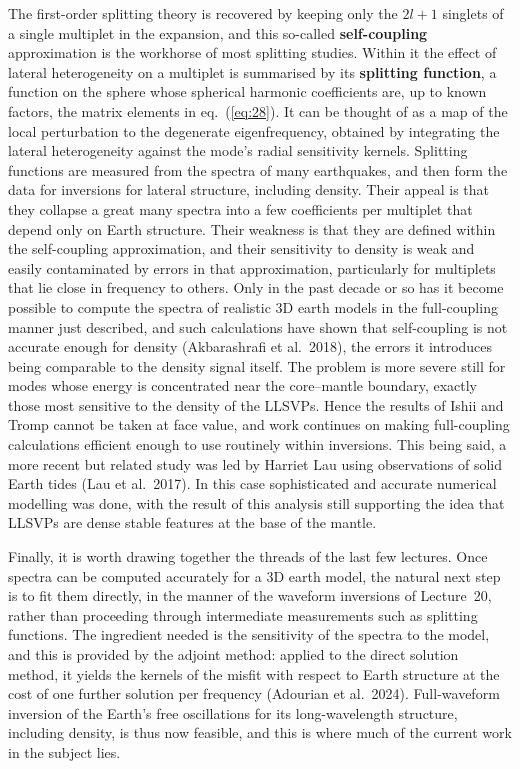 The first-order splitting theory is recovered by keeping only the $2l+1$ singlets of a single multiplet in the expansion, 
and this so-called \textbf{self-coupling} approximation is the workhorse of most splitting studies. Within it the effect of lateral heterogeneity 
on a multiplet is summarised by its \textbf{splitting function}, a function on the sphere whose spherical harmonic coefficients 
are, up to known factors, the matrix elements in eq.~(\ref{eq:28}). It can be thought of as a map of the 
local perturbation to the degenerate eigenfrequency, obtained by integrating the lateral heterogeneity against the mode's 
radial sensitivity kernels. Splitting functions are measured from the spectra of many earthquakes, and then form the data 
for inversions for lateral structure, including density. Their appeal is that they collapse a great many spectra into a few 
coefficients per multiplet that depend only on Earth structure. Their weakness is that they are defined 
within the self-coupling approximation, and their sensitivity to density is weak and easily contaminated by errors in that 
approximation, particularly for multiplets that lie close in frequency to others. Only in the past decade or so has it 
become possible to compute the spectra of realistic 3D earth models in the full-coupling manner just described, 
and such calculations have shown that self-coupling is not accurate enough for density (Akbarashrafi et al.\ 2018), the 
errors it introduces being comparable to the density signal itself. The problem is more severe still for modes 
whose energy is concentrated near the core--mantle boundary, exactly those most sensitive to the density of the LLSVPs. 
Hence the results of Ishii and Tromp cannot be taken at face value, and work continues on making full-coupling calculations 
efficient enough to use routinely within inversions. This being said, a more recent but related study was
led by Harriet Lau using observations of solid Earth tides (Lau et al.\ 2017). In this case sophisticated and accurate numerical modelling 
was done, with the result of this analysis still supporting the idea that LLSVPs are dense stable features 
at the base of the mantle. 

Finally, it is worth drawing together the threads of the last few lectures. Once spectra can be computed accurately for a 3D earth 
model, the natural next step is to fit them directly, in the manner of the waveform inversions of Lecture~20, rather than 
proceeding through intermediate measurements such as splitting functions. The ingredient needed is the sensitivity of the 
spectra to the model, and this is provided by the adjoint method: applied to the direct solution method, 
it yields the kernels of the misfit with respect to Earth structure at the cost of one further solution per frequency 
(Adourian et al.\ 2024). Full-waveform inversion of the Earth's free oscillations for its long-wavelength 
structure, including density, is thus now feasible, and this is where much of the current work in the subject lies.

